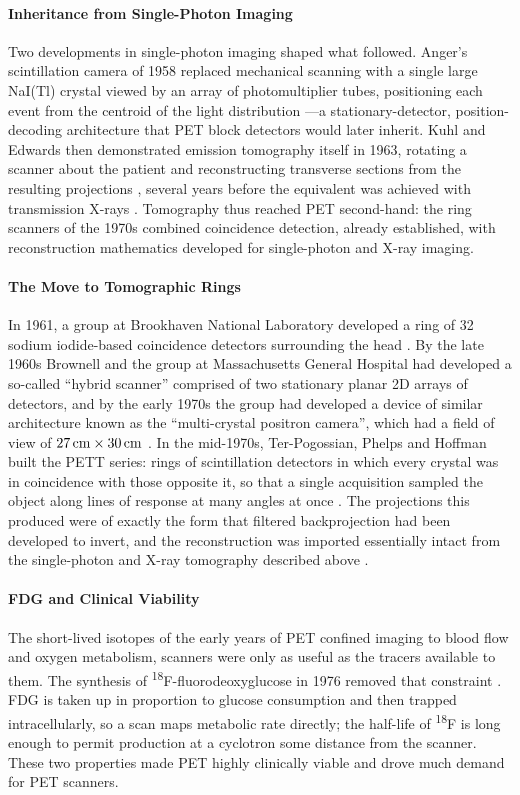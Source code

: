 \paragraph{Inheritance from Single-Photon Imaging}
Two developments in single-photon imaging shaped what followed.
Anger's scintillation camera of 1958 replaced mechanical scanning with a single large NaI(Tl) crystal viewed by an array of photomultiplier tubes, positioning each event from the centroid of the light distribution \cite{Anger1958}---a stationary-detector, position-decoding architecture that PET block detectors would later inherit.
Kuhl and Edwards then demonstrated emission tomography itself in 1963, rotating a scanner about the patient and reconstructing transverse sections from the resulting projections \cite{Kuhl1963}, several years before the equivalent was achieved with transmission X-rays \cite{Hounsfield1973}.
Tomography thus reached PET second-hand: the ring scanners of the 1970s combined coincidence detection, already established, with reconstruction mathematics developed for single-photon and X-ray imaging.

\paragraph{The Move to Tomographic Rings}
In 1961, a group at Brookhaven National Laboratory developed a ring of 32 sodium iodide-based coincidence detectors surrounding the head \cite{Rankowitz2008}.
By the late 1960s Brownell and the group at Massachusetts General Hospital had developed a so-called ``hybrid scanner'' comprised of two stationary planar 2D arrays of detectors, and by the early 1970s the group had developed a device of similar architecture known as the ``multi-crystal positron camera'', which had a field of view of $\qty{27}{\centi\metre}\times\qty{30}{\centi\metre}$ \cite{Burnham2008}.
In the mid-1970s, Ter-Pogossian, Phelps and Hoffman built the PETT series: rings of scintillation detectors in which every crystal was in coincidence with those opposite it, so that a single acquisition sampled the object along lines of response at many angles at once \cite{Ter-Pogossian1975}.
The projections this produced were of exactly the form that filtered backprojection had been developed to invert, and the reconstruction was imported essentially intact from the single-photon and X-ray tomography described above \cite{Phelps1975}.

\paragraph{FDG and Clinical Viability}
The short-lived isotopes of the early years of PET confined imaging to blood flow and oxygen metabolism, scanners were only as useful as the tracers available to them.
The synthesis of \textsuperscript{18}F-fluorodeoxyglucose in 1976 removed that constraint \cite{Ido1978}.
FDG is taken up in proportion to glucose consumption and then trapped intracellularly, so a scan maps metabolic rate directly; the  half-life of \textsuperscript{18}F is long enough to permit production at a cyclotron some distance from the scanner.
These two properties made PET highly clinically viable and drove much demand for PET scanners.

